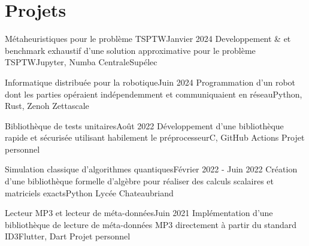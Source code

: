 \section{Projets}
\resumeSubHeadingListStart
    \resumeProjectHeading
    {Métaheuristiques pour le problème TSPTW}{Janvier 2024}
    {Developpement \& et benchmark exhaustif d'une solution approximative pour le problème TSPTW}{Jupyter, Numba}
    {}
    {CentraleSupélec}

    \resumeProjectHeading
    {Informatique distribuée pour la robotique}{Juin 2024}
    {Programmation d'un robot dont les parties opéraient indépendemment et communiquaient en réseau}{Python, Rust, Zenoh}
    {}
    {Zettascale}

    \resumeProjectHeading
    {Bibliothèque de tests unitaires}{\quad Août 2022}
    {Développement d'une bibliothèque rapide et sécurisée utilisant habilement le préprocesseur}{C, GitHub Actions}
    {}
    {Projet personnel}
    \vspace{-7pt}
    \resumeItemListStart
    \resumeItemListEnd

    \resumeProjectHeading
    {Simulation classique d'algorithmes quantiques}{Février 2022 - Juin 2022}
    {Création d'une bibliothèque formelle d'algèbre pour réaliser des calculs scalaires et matriciels exacts}{Python}
    {}
    {Lycée Chateaubriand}
    \vspace{-7pt}
    \resumeItemListStart
    \resumeItemListEnd

    \resumeProjectHeading
    {Lecteur MP3 et lecteur de méta-données}{Juin 2021}
    {Implémentation d'une bibliothèque de lecture de méta-données MP3 directement à partir du standard ID3}{Flutter, Dart}
    {}
    {Projet personnel}
    \vspace{-7pt}
    \resumeItemListStart
    \resumeItemListEnd

\resumeSubHeadingListEnd
